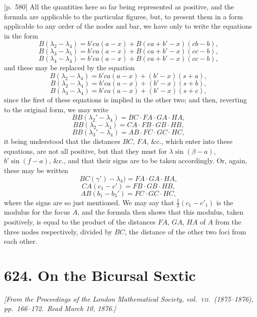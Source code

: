\documentclass[11pt,a4paper]{book}
\begin{document}
[p.~580] All the quantities here so far being represented as positive, and the formula are applicable to the particular figures, but, to present them in a form applicable to any order of the nodes and bar, we have only to write the equations in the form
\[
B(\lambda_2 - \lambda_4) = b' c a (a - x) + B(c a + b' - x)(c b - b),
\]
\[
B(\lambda_3 - \lambda_5) = b' c a (a - x) + B(c a + b' - x)(c c - b),
\]
\[
B(\lambda_4 - \lambda_4) = b' c a (a - x) + B(c a + b' - x)(c c - b),
\]
and these may be replaced by the equation
\[
B(\lambda_2 - \lambda_4) = b' c a (a - x) + (b' - x)(s + a),
\]
\[
B(\lambda_2 - \lambda_4) = b' c a (a - x) + (b' - x)(s + b),
\]
\[
B(\lambda_3 - \lambda_4) = b' c a (a - x) + (b' - x)(s + c),
\]
since the first of these equations is implied in the other two; and then, reverting to the original form, we may write
\[
BB(\lambda_2' - \lambda_4) = BC \cdot FA \cdot GA \cdot HA,
\]
\[
BB(\lambda_2 - \lambda_4) = CA \cdot FB \cdot GB \cdot HB,
\]
\[
BB(\lambda_3' - \lambda_4) = AB \cdot FC \cdot GC \cdot HC,
\]
it being understood that the distances $BC$, $FA$, \&c., which enter into these equations, are not all positive, but that they must for $\lambda \sin (\beta - a)$, $b' \sin (f - a)$, \&c., and that their signs are to be taken accordingly. Or, again, these may be written
\[
BC(\gamma') - \lambda_4) = FA \cdot GA \cdot HA,
\]
\[
CA(c_1 - c') = FB \cdot GB \cdot HB,
\]
\[
AB(b_1 - b_3') = FC \cdot GC \cdot HC,
\]
where the signs are so just mentioned. We may say that $\frac{1}{2}(c_1 - c'_1)$ is the modulus for the focus $A$, and the formula then shows that this modulus, taken positively, is equal to the product of the distances $FA$, $GA$, $HA$ of $A$ from the three nodes respectively, divided by $BC$, the distance of the other two foci from each other.

\bigskip

\newpage
\section*{\textbf{624.} On the Bicursal Sextic}

\textit{[From the Proceedings of the London Mathematical Society, vol.\ \textsc{vii}.\ (1875--1876), pp.~166--172.\ Read March 10, 1876.]}
\end{document}
